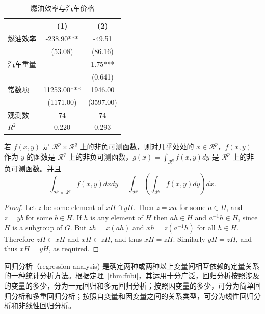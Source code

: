 \documentclass[cn,hazy,blue,10.5pt,normal]{elegantnote}
\begin{document}
\begin{table}[htbp]
  \centering
  \small
  \caption{燃油效率与汽车价格}
    \begin{tabular}{lcc}
    \toprule
                  &       (1)         &        (2)      \\
    \midrule
    燃油效率      &   -238.90***      &      -49.51     \\
                  &    (53.08)        &      (86.16)    \\
    汽车重量      &                   &        1.75***  \\
                  &                   &       (0.641)   \\
    常数项        &  11253.00***      &    1946.00      \\
                  &  (1171.00)        &   (3597.00)     \\
    观测数        &     74            &      74         \\
    $R^2$         &      0.220        &       0.293     \\
    \bottomrule
    \end{tabular}%
  \label{tab:reg}%
\end{table}%

\begin{theorem}[Fubini 定理]\label{thm:fubi}
若 $f(x,y)$ 是 $\mathcal{R}^p\times\mathcal{R}^q$ 上的非负可测函数，则对几乎处处的 $x\in \mathcal{R}^p$，$f(x,y)$ 作为 $y$ 的函数是 $\mathcal{R}^q$ 上的非负可测函数，$g(x)=\int_{\mathcal{R}^q}f(x,y) dy$ 是 $\mathcal{R}^p$ 上的非负可测函数。并且
\begin{equation}\label{eq:461}
  \int_{\mathcal{R}^p\times\mathcal{R}^q} f(x,y) dxdy=\int_{\mathcal{R}^p}\left(\int_{\mathcal{R}^q}f(x,y)dy\right)dx.
\end{equation}
\end{theorem}

\begin{proof}
Let $z$ be some element of $xH \cap yH$.  Then $z = xa$ for some $a \in H$, and $z = yb$ for some $b \in H$. If $h$ is any element of $H$ then $ah \in H$ and $a^{-1}h \in H$, since $H$ is a subgroup of $G$. But $zh = x(ah)$ and $xh = z(a^{-1}h)$ for all $h \in H$. Therefore $zH \subset xH$ and $xH \subset zH$, and thus $xH = zH$.  Similarly $yH = zH$, and thus $xH = yH$, as required.
\end{proof}


回归分析（regression analysis) 是确定两种或两种以上变量间相互依赖的定量关系的一种统计分析方法。根据定理~\ref{thm:fubi}，其运用十分广泛，回归分析按照涉及的变量的多少，分为一元回归和多元回归分析；按照因变量的多少，可分为简单回归分析和多重回归分析；按照自变量和因变量之间的关系类型，可分为线性回归分析和非线性回归分析。
\end{document}
